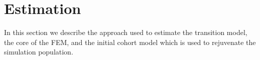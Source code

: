 \section{Estimation}
In this section we describe the approach used to estimate the transition model, the core of the FEM, and the initial cohort model which is 
used to rejuvenate the simulation population. 




